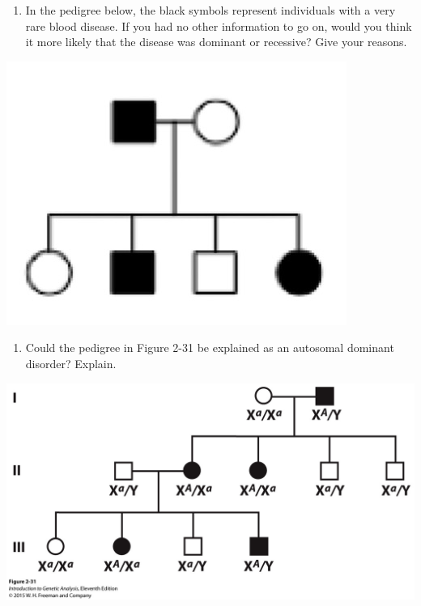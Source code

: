 \documentclass[11pt,]{article}
\providecommand{\tightlist}{%
  \setlength{\itemsep}{0pt}\setlength{\parskip}{0pt}}
\begin{document}
\begin{blackbox}

\begin{enumerate}
\def\labelenumi{\arabic{enumi}.}
\setcounter{enumi}{42}
\tightlist
\item
  In the pedigree below, the black symbols represent individuals with a
  very rare blood disease. If you had no other information to go on,
  would you think it more likely that the disease was dominant or
  recessive? Give your reasons.
\end{enumerate}

\hfill\break

\begin{center}\includegraphics[width=0.35\linewidth,]{input/43pedigree} \end{center}

\vspace{15cm}

\end{blackbox}

\begin{blackbox}

\begin{enumerate}
\def\labelenumi{\arabic{enumi}.}
\setcounter{enumi}{12}
\tightlist
\item
  Could the pedigree in Figure 2-31 be explained as an autosomal
  dominant disorder? Explain.
\end{enumerate}

\hfill\break

\begin{center}\includegraphics[width=0.55\linewidth,]{input/figure_02_31} \end{center}

\vspace{14cm}

\end{blackbox}
\end{document}
